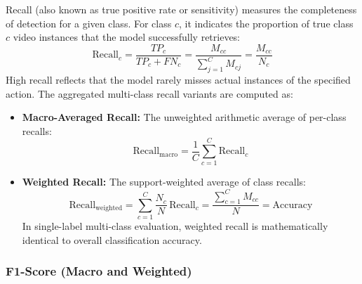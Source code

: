 Recall (also known as true positive rate or sensitivity) measures the completeness of detection for a given class. For class $c$, it indicates the proportion of true class $c$ video instances that the model successfully retrieves:
\begin{equation}
\text{Recall}_c = \frac{TP_c}{TP_c + FN_c} = \frac{M_{cc}}{\sum_{j=1}^{C} M_{cj}} = \frac{M_{cc}}{N_c}
\end{equation}
High recall reflects that the model rarely misses actual instances of the specified action. The aggregated multi-class recall variants are computed as:
\begin{itemize}[leftmargin=*]
    \item \textbf{Macro-Averaged Recall:} The unweighted arithmetic average of per-class recalls:
    \begin{equation}
    \text{Recall}_{\text{macro}} = \frac{1}{C}\sum_{c=1}^{C} \text{Recall}_c
    \end{equation}
    \item \textbf{Weighted Recall:} The support-weighted average of class recalls:
    \begin{equation}
    \text{Recall}_{\text{weighted}} = \sum_{c=1}^{C} \frac{N_c}{N} \, \text{Recall}_c = \frac{\sum_{c=1}^{C} M_{cc}}{N} = \text{Accuracy}
    \end{equation}
    In single-label multi-class evaluation, weighted recall is mathematically identical to overall classification accuracy.
\end{itemize}

\subsubsection{F1-Score (Macro and Weighted)}

